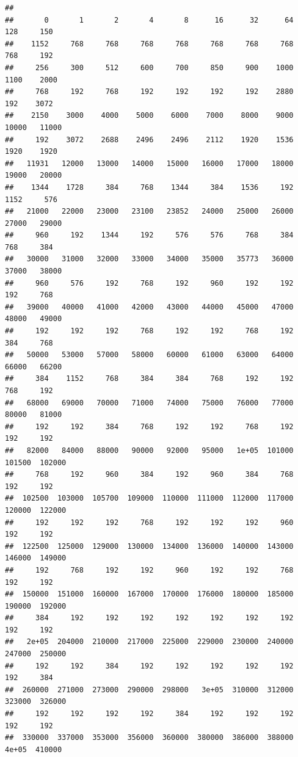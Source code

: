 \documentclass[
]{article}
\begin{document}
\begin{verbatim}
## 
##       0       1       2       4       8      16      32      64     128     150 
##    1152     768     768     768     768     768     768     768     768     192 
##     256     300     512     600     700     850     900    1000    1100    2000 
##     768     192     768     192     192     192     192    2880     192    3072 
##    2150    3000    4000    5000    6000    7000    8000    9000   10000   11000 
##     192    3072    2688    2496    2496    2112    1920    1536    1920    1920 
##   11931   12000   13000   14000   15000   16000   17000   18000   19000   20000 
##    1344    1728     384     768    1344     384    1536     192    1152     576 
##   21000   22000   23000   23100   23852   24000   25000   26000   27000   29000 
##     960     192    1344     192     576     576     768     384     768     384 
##   30000   31000   32000   33000   34000   35000   35773   36000   37000   38000 
##     960     576     192     768     192     960     192     192     192     768 
##   39000   40000   41000   42000   43000   44000   45000   47000   48000   49000 
##     192     192     192     768     192     192     768     192     384     768 
##   50000   53000   57000   58000   60000   61000   63000   64000   66000   66200 
##     384    1152     768     384     384     768     192     192     768     192 
##   68000   69000   70000   71000   74000   75000   76000   77000   80000   81000 
##     192     192     384     768     192     192     768     192     192     192 
##   82000   84000   88000   90000   92000   95000   1e+05  101000  101500  102000 
##     768     192     960     384     192     960     384     768     192     192 
##  102500  103000  105700  109000  110000  111000  112000  117000  120000  122000 
##     192     192     192     768     192     192     192     960     192     192 
##  122500  125000  129000  130000  134000  136000  140000  143000  146000  149000 
##     192     768     192     192     960     192     192     768     192     192 
##  150000  151000  160000  167000  170000  176000  180000  185000  190000  192000 
##     384     192     192     192     192     192     192     192     192     192 
##   2e+05  204000  210000  217000  225000  229000  230000  240000  247000  250000 
##     192     192     384     192     192     192     192     192     192     384 
##  260000  271000  273000  290000  298000   3e+05  310000  312000  323000  326000 
##     192     192     192     192     384     192     192     192     192     192 
##  330000  337000  353000  356000  360000  380000  386000  388000   4e+05  410000 

\end{verbatim}
\end{document}
